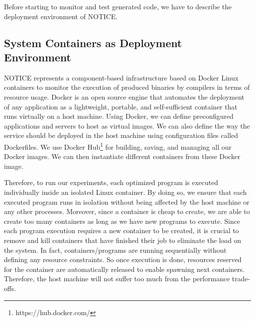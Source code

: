 Before starting to monitor and test generated code, we have to describe the deployment environment of NOTICE.
\subsection{System Containers as Deployment Environment}

NOTICE represents a component-based infrastructure based on Docker Linux containers to monitor the execution of produced binaries by compilers in terms of resource usage. 
Docker is an open source engine that automates the deployment of any application as a lightweight, portable, and self-sufficient container that runs virtually on a host machine. 
Using Docker, we can define preconfigured applications and servers to host as virtual images. We can also define the way the service should be deployed in the host machine using configuration files called Dockerfiles. 
We use Docker Hub\footnote{https://hub.docker.com/} for building, saving, and managing all our Docker images. 
We can then instantiate different containers from these Docker image. 

Therefore, to run our experiments, each optimized program is executed individually inside an isolated Linux container. By doing so, we ensure that each executed program runs in isolation without being affected by the host machine or any other processes. Moreover, since a container is cheap to create, we are able to create too many containers as long as we have new programs to execute. 
Since each program execution requires a new container to be created, it is crucial to remove and kill containers that have finished their job to eliminate the load on the system. In fact, containers/programs are running sequentially without defining any resource constraints. So once execution is done, resources reserved for the container are automatically released to enable spawning next containers. Therefore, the host machine will not suffer too much from the performance trade-offs.

